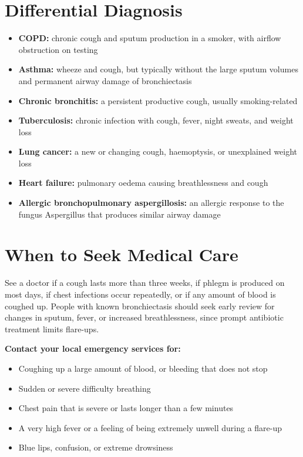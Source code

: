 \section*{Differential Diagnosis}
\begin{itemize}
    \item \textbf{COPD:} chronic cough and sputum production in a smoker, with airflow obstruction on testing
    \item \textbf{Asthma:} wheeze and cough, but typically without the large sputum volumes and permanent airway damage of bronchiectasis
    \item \textbf{Chronic bronchitis:} a persistent productive cough, usually smoking-related
    \item \textbf{Tuberculosis:} chronic infection with cough, fever, night sweats, and weight loss
    \item \textbf{Lung cancer:} a new or changing cough, haemoptysis, or unexplained weight loss
    \item \textbf{Heart failure:} pulmonary oedema causing breathlessness and cough
    \item \textbf{Allergic bronchopulmonary aspergillosis:} an allergic response to the fungus Aspergillus that produces similar airway damage
\end{itemize}

\section*{When to Seek Medical Care}
See a doctor if a cough lasts more than three weeks, if phlegm is produced on most days, if chest infections occur repeatedly, or if any amount of blood is coughed up. People with known bronchiectasis should seek early review for changes in sputum, fever, or increased breathlessness, since prompt antibiotic treatment limits flare-ups.

\textbf{Contact your local emergency services for:}
\begin{itemize}
    \item Coughing up a large amount of blood, or bleeding that does not stop
    \item Sudden or severe difficulty breathing
    \item Chest pain that is severe or lasts longer than a few minutes
    \item A very high fever or a feeling of being extremely unwell during a flare-up
    \item Blue lips, confusion, or extreme drowsiness
\end{itemize}

